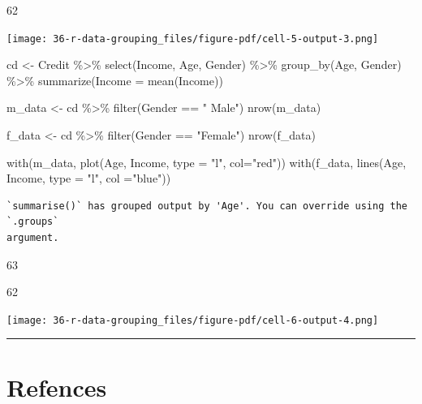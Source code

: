 \documentclass[
  letterpaper,
  DIV=11,
  numbers=noendperiod]{scrreprt}
\newenvironment{Shaded}{\begin{snugshade}}{\end{snugshade}}
\newcommand{\AttributeTok}[1]{\textcolor[rgb]{0.40,0.45,0.13}{#1}}
\newcommand{\FunctionTok}[1]{\textcolor[rgb]{0.28,0.35,0.67}{#1}}
\newcommand{\NormalTok}[1]{\textcolor[rgb]{0.00,0.23,0.31}{#1}}
\newcommand{\OtherTok}[1]{\textcolor[rgb]{0.00,0.23,0.31}{#1}}
\newcommand{\SpecialCharTok}[1]{\textcolor[rgb]{0.37,0.37,0.37}{#1}}
\newcommand{\StringTok}[1]{\textcolor[rgb]{0.13,0.47,0.30}{#1}}
\begin{document}
62

\texttt{[image: 36-r-data-grouping\_files/figure-pdf/cell-5-output-3.png]}

\begin{Shaded}
\begin{Highlighting}[]
\NormalTok{cd }\OtherTok{\textless{}{-}}\NormalTok{ Credit }\SpecialCharTok{\%\textgreater{}\%}
\FunctionTok{select}\NormalTok{(Income, Age, Gender) }\SpecialCharTok{\%\textgreater{}\%}
\FunctionTok{group\_by}\NormalTok{(Age, Gender) }\SpecialCharTok{\%\textgreater{}\%}
\FunctionTok{summarize}\NormalTok{(}\AttributeTok{Income =} \FunctionTok{mean}\NormalTok{(Income))}

\NormalTok{m\_data }\OtherTok{\textless{}{-}}\NormalTok{ cd }\SpecialCharTok{\%\textgreater{}\%} \FunctionTok{filter}\NormalTok{(Gender }\SpecialCharTok{==} \StringTok{" Male"}\NormalTok{)}
\FunctionTok{nrow}\NormalTok{(m\_data)}

\NormalTok{f\_data }\OtherTok{\textless{}{-}}\NormalTok{ cd }\SpecialCharTok{\%\textgreater{}\%} \FunctionTok{filter}\NormalTok{(Gender }\SpecialCharTok{==} \StringTok{"Female"}\NormalTok{)}
\FunctionTok{nrow}\NormalTok{(f\_data)}

\FunctionTok{with}\NormalTok{(m\_data, }\FunctionTok{plot}\NormalTok{(Age, Income, }\AttributeTok{type =} \StringTok{"l"}\NormalTok{, }\AttributeTok{col=}\StringTok{"red"}\NormalTok{))}
\FunctionTok{with}\NormalTok{(f\_data, }\FunctionTok{lines}\NormalTok{(Age, Income, }\AttributeTok{type =} \StringTok{"l"}\NormalTok{, }\AttributeTok{col =}\StringTok{"blue"}\NormalTok{))}
\end{Highlighting}
\end{Shaded}

\begin{verbatim}
`summarise()` has grouped output by 'Age'. You can override using the `.groups`
argument.
\end{verbatim}

63

62

\texttt{[image: 36-r-data-grouping\_files/figure-pdf/cell-6-output-4.png]}

\begin{center}\rule{0.5\linewidth}{0.5pt}\end{center}

\section{Refences}\label{refences-6}
\end{document}
